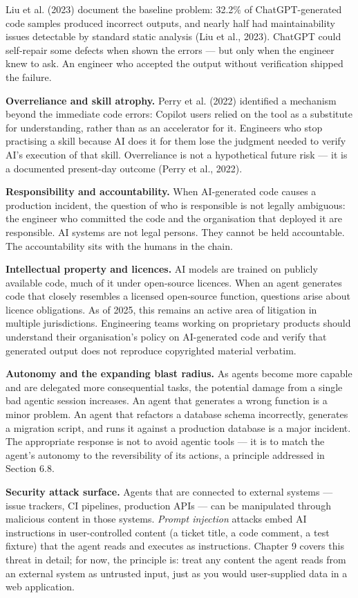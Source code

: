 \documentclass[11pt,a4paper]{book}
\begin{document}
Liu et al. (2023) document the baseline problem: 32.2\% of ChatGPT-generated code samples produced incorrect outputs, and nearly half had maintainability issues detectable by standard static analysis (Liu et al., 2023). ChatGPT could self-repair some defects when shown the errors --- but only when the engineer knew to ask. An engineer who accepted the output without verification shipped the failure.

\textbf{Overreliance and skill atrophy.} Perry et al. (2022) identified a mechanism beyond the immediate code errors: Copilot users relied on the tool as a substitute for understanding, rather than as an accelerator for it. Engineers who stop practising a skill because AI does it for them lose the judgment needed to verify AI's execution of that skill. Overreliance is not a hypothetical future risk --- it is a documented present-day outcome (Perry et al., 2022).

\textbf{Responsibility and accountability.} When AI-generated code causes a production incident, the question of who is responsible is not legally ambiguous: the engineer who committed the code and the organisation that deployed it are responsible. AI systems are not legal persons. They cannot be held accountable. The accountability sits with the humans in the chain.

\textbf{Intellectual property and licences.} AI models are trained on publicly available code, much of it under open-source licences. When an agent generates code that closely resembles a licensed open-source function, questions arise about licence obligations. As of 2025, this remains an active area of litigation in multiple jurisdictions. Engineering teams working on proprietary products should understand their organisation's policy on AI-generated code and verify that generated output does not reproduce copyrighted material verbatim.

\textbf{Autonomy and the expanding blast radius.} As agents become more capable and are delegated more consequential tasks, the potential damage from a single bad agentic session increases. An agent that generates a wrong function is a minor problem. An agent that refactors a database schema incorrectly, generates a migration script, and runs it against a production database is a major incident. The appropriate response is not to avoid agentic tools --- it is to match the agent's autonomy to the reversibility of its actions, a principle addressed in Section 6.8.

\textbf{Security attack surface.} Agents that are connected to external systems --- issue trackers, CI pipelines, production APIs --- can be manipulated through malicious content in those systems. \textit{Prompt injection} attacks embed AI instructions in user-controlled content (a ticket title, a code comment, a test fixture) that the agent reads and executes as instructions. Chapter 9 covers this threat in detail; for now, the principle is: treat any content the agent reads from an external system as untrusted input, just as you would user-supplied data in a web application.
\end{document}
